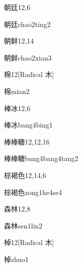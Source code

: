 \begin{entry}{朝廷}{12,6}
  \begin{phonetics}{朝廷}{chao2ting2}
  \end{phonetics}
\end{entry}

\begin{entry}{朝鲜}{12,14}
  \begin{phonetics}{朝鲜}{chao2xian3}
  \end{phonetics}
\end{entry}

\begin{entry}{棉}{12}[Radical 木]
  \begin{phonetics}{棉}{mian2}
  \end{phonetics}
\end{entry}

\begin{entry}{棒冰}{12,6}
  \begin{phonetics}{棒冰}{bang4bing1}
  \end{phonetics}
\end{entry}

\begin{entry}{棒棒糖}{12,12,16}
  \begin{phonetics}{棒棒糖}{bang4bang4tang2}
  \end{phonetics}
\end{entry}

\begin{entry}{棕褐色}{12,14,6}
  \begin{phonetics}{棕褐色}{zong1he4se4}
  \end{phonetics}
\end{entry}

\begin{entry}{森林}{12,8}
  \begin{phonetics}{森林}{sen1lin2}
  \end{phonetics}
\end{entry}

\begin{entry}{棹}{12}[Radical 木]
  \begin{phonetics}{棹}{zhuo1}
  \end{phonetics}
\end{entry}

